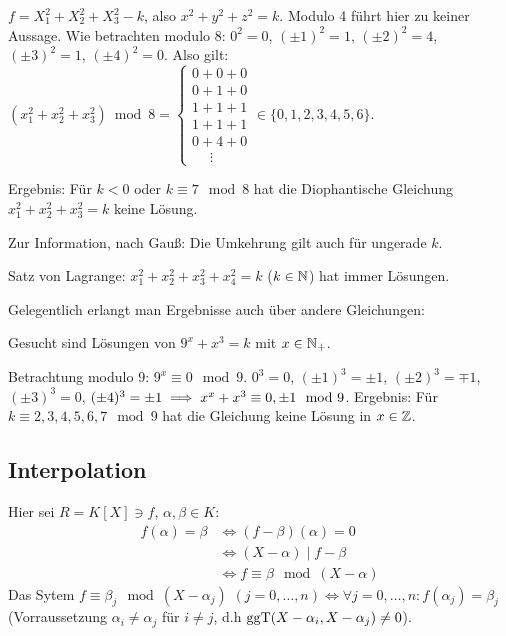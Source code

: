 \documentclass[a4paper,twoside,DIV15,BCOR12mm]{scrbook}
\begin{document}
\begin{beispiel}
$f=X_1^2 + X_2^2 + X_3^2 - k$, also $x^2 + y^2 + z^2 = k$. Modulo 4
führt hier zu keiner Aussage. Wie betrachten modulo 8: $0^2 = 0$,
$(\pm1)^2 = 1$, $(\pm2)^2 = 4$, $(\pm3)^2=1$, $(\pm4)^2 = 0$. Also
gilt: $(x_1^2 + x_2^2 + x_3^2) \bmod 8 =
\begin{cases}
0+0+0 \\ 0+1+0 \\ 1+1+1 \\ 1+1+1 \\ 0 + 4+ 0 \\ \ \ \ \ \ \,\vdots  %
\end{cases} \in \{0,1,2,3,4,5,6\}$.

Ergebnis: Für $k<0$ oder $k\equiv 7 \mod 8$ hat die Diophantische
Gleichung $x_1^2 + x_2^2 + x_3^2 = k$ keine Lösung.

Zur Information, nach Gauß: Die Umkehrung gilt auch für ungerade $k$. %

Satz von Lagrange: $x_1^2 + x_2^2 + x_3^2 + x_4^2 = k$ ($k\in\mathbb{N}$)
hat immer Lösungen.
\end{beispiel}

Gelegentlich erlangt man Ergebnisse auch über andere Gleichungen:

\begin{beispiel}
Gesucht sind  Lösungen von $9^x + x^3 = k$ mit $x\in\mathbb{N}_+$.

Betrachtung modulo 9: $9^x \equiv 0 \mod 9$. $0^3 = 0$, $(\pm1)^3 =
\pm1$, $(\pm2)^3 = \mp 1$, $(\pm3)^3 = 0$, $(\pm4)^3 = \pm1 \implies
x^x+ x^3 \equiv 0 , \pm 1 \mod 9$. Ergebnis: Für $k \equiv
2,3,4,5,6,7 \mod 9$ hat die Gleichung keine Lösung in $x\in\mathbb{Z}$.
\end{beispiel}

\subsection{Interpolation}

Hier sei $R=K[X] \ni f$, $\alpha,\beta \in K$:
\begin{align*}
f(\alpha) = \beta &\iff (f-\beta)(\alpha) = 0 \\
&\iff (X-\alpha)\mid f-\beta \\
&\iff f \equiv \beta \mod (X-\alpha)
\end{align*}
Das Sytem $f \equiv \beta_j \mod (X-\alpha_j)$ $(j=0,\ldots,n) \iff
\forall j=0,\ldots,n : f(\alpha_j)=\beta_j$ (Vorraussetzung
$\alpha_i\ne \alpha_j$ für $i\ne j$, d.h
$\mathop{\rm ggT}\nolimits(X-\alpha_i,X-\alpha_j)\ne 0$).
\end{document}
